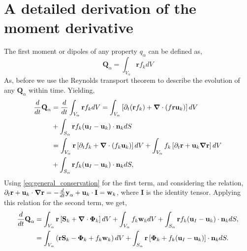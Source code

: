 \section{A detailed derivation of the moment derivative}
\label{ap:moment_derivative}
The first moment or dipoles of any property $q_\alpha$ can be defined as,
\begin{equation*}
    \textbf{Q}_\alpha 
    = \int_{V_\alpha} \textbf{r} f_k dV
\end{equation*}
As, before we use the Reynolds transport theorem to describe the evolution of any $\textbf{Q}_\alpha$ within time. 
Yielding,
\begin{align}
    \frac{d}{d t} \textbf{Q}_\alpha
    & = \frac{d}{d t} \int_{V_\alpha} \textbf{r} f_k dV  
    =  \int_{V_\alpha} \left[
        \partial_t(\textbf{r}  f_k)
        + \bm{\nabla} \cdot \left(f \textbf{r} \textbf{u}_k\right)
    \right]dV \nonumber \\
    &+ \int_{S_\alpha} \textbf{r}  f_k  (\textbf{u}_I-\textbf{u}_k)\cdot \textbf{n}_k  dS  \nonumber \\
    &=  \int_{V_\alpha} \textbf{r}\left[
        \partial_t f_k
        + \bm{\nabla} \cdot \left(f_k \textbf{u}_k\right)
    \right] dV
    + \int_{V_\alpha} f_k \left[
        \partial_t \textbf{r}
        +\textbf{u}_k \bm{\nabla} \textbf{r}
    \right]dV\\
    &+ \int_{S_\alpha} \textbf{r}  f_k (\textbf{u}_I-\textbf{u}_k)\cdot \textbf{n}_k  dS,
\end{align}
Using \ref{eq:general_conservation} for the first term, and considering the relation,
$  \partial_t \textbf{r}
+ \textbf{u}_k \cdot \bm{\nabla} \textbf{r}
= - \frac{d}{dt} \textbf{y}_\alpha  + \textbf{u}_k \cdot \textbf{I}
= \textbf{w}_k$,
where $\textbf{I}$ is the identity tensor. 
Applying this relation for the second term, we get, 
\begin{align}
    \frac{d}{d t} \textbf{Q}_\alpha
    &= \int_{V_\alpha} \textbf{r} \left[
         \textbf{S}_k +  \bm{\nabla} \cdot \bm{\Phi}_k
    \right]dV
    +\int_{V_\alpha} f_k  \textbf{w}_k dV
    + \int_{S_\alpha} \textbf{r}  f_k (\textbf{u}_I-\textbf{u}_k)\cdot \textbf{n}_k  dS,\\
    &= \int_{V_\alpha} \left( 
        \textbf{r} \textbf{S}_k 
        - \bm{\Phi}_k
        + f_k  \textbf{w}_k 
    \right) dV
    + \int_{S_\alpha} \textbf{r} \left[
        \bm{\Phi}_k
        + f_k (\textbf{u}_I-\textbf{u}_k)
    \right]\cdot \textbf{n}_k  dS.
\end{align}